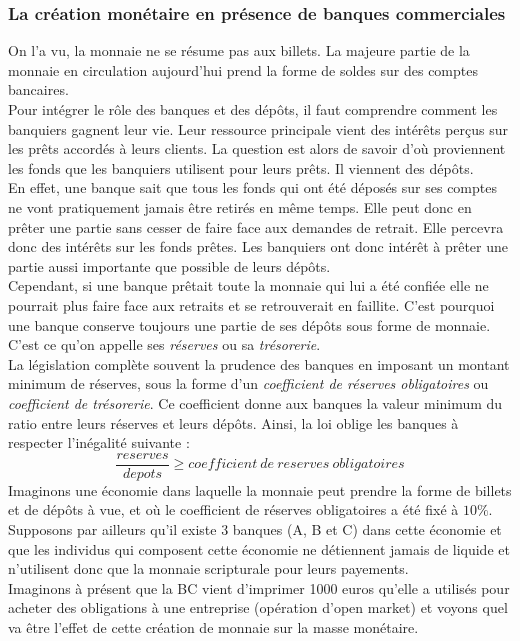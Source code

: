 \documentclass[10pt]{book}
\begin{document}
\subsubsection{La création monétaire en présence de banques commerciales}
On l'a vu, la monnaie ne se résume pas aux billets. La majeure partie de la monnaie en circulation aujourd'hui prend la forme de soldes sur des comptes bancaires.  \\
Pour intégrer le rôle des banques et des dépôts, il faut comprendre comment les banquiers gagnent leur vie. Leur ressource principale vient des intérêts perçus sur les prêts accordés à leurs clients. La question est alors de savoir d'où proviennent les fonds que les banquiers utilisent pour leurs prêts. Il viennent des dépôts. \\
En effet, une banque sait que tous les fonds qui ont été déposés sur ses comptes ne vont pratiquement jamais être retirés en même temps. Elle peut donc en prêter une partie sans cesser de faire face aux demandes de retrait. Elle percevra donc des intérêts sur les fonds prêtes. Les banquiers ont donc intérêt à prêter une partie aussi importante que possible de leurs dépôts. \\
Cependant, si une banque prêtait toute la monnaie qui lui a été confiée elle ne pourrait plus faire face aux retraits et se retrouverait en faillite. C'est pourquoi une banque conserve toujours une partie de ses dépôts sous forme de monnaie. C'est ce qu'on appelle ses \textit{réserves} ou sa \textit{trésorerie}. \\
La législation complète souvent la prudence des banques en imposant un montant minimum de réserves, sous la forme d'un \textit{coefficient de réserves obligatoires} ou \textit{coefficient de trésorerie}. Ce coefficient donne aux banques la valeur minimum du ratio entre leurs réserves et leurs dépôts. Ainsi, la loi oblige les banques à respecter l'inégalité suivante :
$$\frac{reserves}{depots} \geq coefficient~de~reserves~obligatoires$$
Imaginons une économie dans laquelle la monnaie peut prendre la forme de billets et de dépôts à vue, et où le coefficient de réserves obligatoires a été fixé à $10\%$. Supposons par ailleurs qu'il existe 3 banques (A, B et C) dans cette économie et que les individus qui composent cette économie ne détiennent jamais de liquide et n'utilisent donc que la monnaie scripturale pour leurs payements. \\
Imaginons à présent que la BC vient d'imprimer 1000 euros qu'elle a utilisés pour acheter des obligations à une entreprise (opération d'open market) et voyons quel va être l'effet de cette création de monnaie sur la masse monétaire. \\
\end{document}
